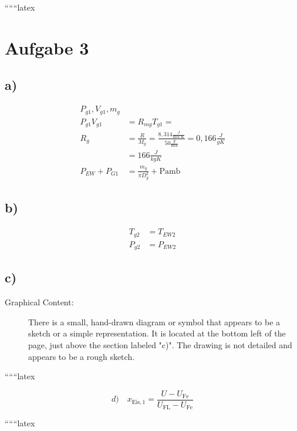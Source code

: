
``````latex


\section*{Aufgabe 3}

\subsection*{a)}
\begin{align*}
    P_{g1}, V_{g1}, m_g \\
    P_{g1} V_{g1} &= R_{mg} T_{g1} = \\
    R_g &= \frac{R}{M_g} = \frac{8{,}314 \frac{J}{\text{mol K}}}{50 \frac{g}{\text{mol}}} = 0{,}166 \frac{J}{g K} \\
    &= 166 \frac{J}{kg K} \\
    P_{EW} + P_{G1} &= \frac{m_g}{\pi D^2_g} + \text{Pamb}
\end{align*}

\subsection*{b)}
\begin{align*}
    T_{g2} &= T_{EW2} \\
    P_{g2} &= P_{EW2}
\end{align*}

\subsection*{c)}
\begin{description}
    \item[Graphical Content:] There is a small, hand-drawn diagram or symbol that appears to be a sketch or a simple representation. It is located at the bottom left of the page, just above the section labeled "c)". The drawing is not detailed and appears to be a rough sketch.
\end{description}

``````latex


\begin{equation*}
d) \quad x_{\text{Eis},1} = \frac{U - U_{\text{Fe}}}{U_{\text{FL}} - U_{\text{Fe}}}
\end{equation*}

``````latex


